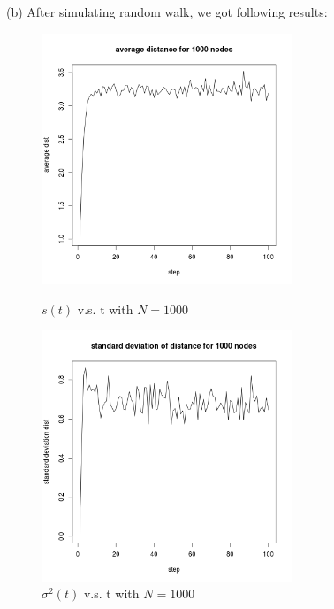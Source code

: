\documentclass[draftcls,12pt,onecolumn]{IEEEtran}
\begin{document}
(b) After simulating random walk, we got following results:
\begin{figure}[htbp]
\centering
\begin{minipage}[t]{0.48\textwidth}
\centering
\includegraphics[width=7.5cm]{2_1_b_distance.png}
\caption{$s(t)$ v.s. t with $N = 1000$}
\label{fig01}
\end{minipage}
\begin{minipage}[t]{0.48\textwidth}
\centering
\includegraphics[width=7.5cm]{2_1_b_deviation.png}
\caption{$\sigma^2(t)$ v.s. t with $N = 1000$}
\label{fig02}
\end{minipage}
\end{figure}
\end{document}
